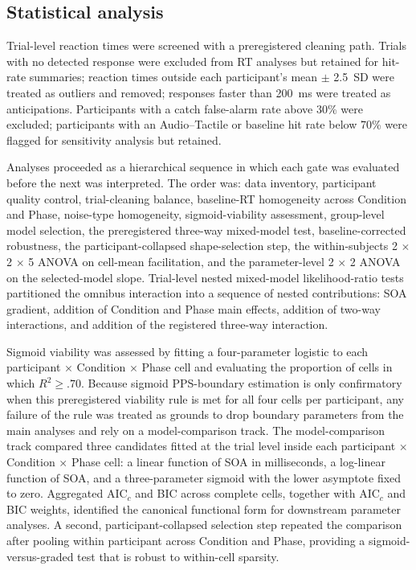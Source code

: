 \subsection{Statistical analysis}
\label{study5:sec:stats}

Trial-level reaction times were screened with a preregistered cleaning path. Trials with no detected response were excluded from RT analyses but retained for hit-rate summaries; reaction times outside each participant's mean $\pm$ 2.5~SD were treated as outliers and removed; responses faster than 200~ms were treated as anticipations. Participants with a catch false-alarm rate above 30\% were excluded; participants with an Audio--Tactile or baseline hit rate below 70\% were flagged for sensitivity analysis but retained.

Analyses proceeded as a hierarchical sequence in which each gate was evaluated before the next was interpreted. The order was: data inventory, participant quality control, trial-cleaning balance, baseline-RT homogeneity across Condition and Phase, noise-type homogeneity, sigmoid-viability assessment, group-level model selection, the preregistered three-way mixed-model test, baseline-corrected robustness, the participant-collapsed shape-selection step, the within-subjects 2 $\times$ 2 $\times$ 5 ANOVA on cell-mean facilitation, and the parameter-level 2 $\times$ 2 ANOVA on the selected-model slope. Trial-level nested mixed-model likelihood-ratio tests partitioned the omnibus interaction into a sequence of nested contributions: SOA gradient, addition of Condition and Phase main effects, addition of two-way interactions, and addition of the registered three-way interaction.

Sigmoid viability was assessed by fitting a four-parameter logistic to each participant $\times$ Condition $\times$ Phase cell and evaluating the proportion of cells in which $R^{2} \geq .70$. Because sigmoid PPS-boundary estimation is only confirmatory when this preregistered viability rule is met for all four cells per participant, any failure of the rule was treated as grounds to drop boundary parameters from the main analyses and rely on a model-comparison track. The model-comparison track compared three candidates fitted at the trial level inside each participant $\times$ Condition $\times$ Phase cell: a linear function of SOA in milliseconds, a log-linear function of SOA, and a three-parameter sigmoid with the lower asymptote fixed to zero. Aggregated $\mathrm{AIC}_{c}$ and BIC across complete cells, together with $\mathrm{AIC}_{c}$ and BIC weights, identified the canonical functional form for downstream parameter analyses. A second, participant-collapsed selection step repeated the comparison after pooling within participant across Condition and Phase, providing a sigmoid-versus-graded test that is robust to within-cell sparsity.

